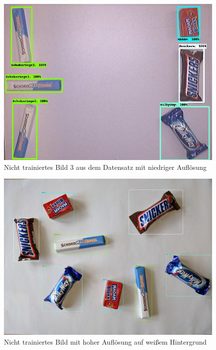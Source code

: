     \begin{figure}[H]
        \centering
        \includegraphics[angle = 90, width = \textwidth]{Bilder/models/model_comparison/faster_rcnn_resnet50_v1_640x640_coco17_tpu-8/non_trained_3.jpg}
        \caption{Nicht trainiertes Bild 3 aus dem Datensatz mit niedriger Auflösung}
    \end{figure}
    
    \begin{figure}[H]
        \centering
        \includegraphics[angle = 90, width = \textwidth]{Bilder/models/model_comparison/faster_rcnn_resnet50_v1_640x640_coco17_tpu-8/HD_on_white.jpg}
        \caption{Nicht trainiertes Bild mit hoher Auflösung auf weißem Hintergrund}
    \end{figure}
    

